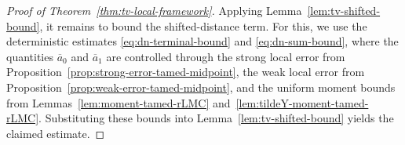 \documentclass[11pt,a4paper,reqno]{amsart}
\theoremstyle{plain}
\theoremstyle{definition}
\theoremstyle{remark}
\begin{document}
\begin{proof}[Proof of Theorem~\ref{thm:tv-local-framework}]
Applying Lemma~\ref{lem:tv-shifted-bound}, it remains to bound the shifted-distance term.  
For this, we use the deterministic estimates \eqref{eq:dn-terminal-bound} and
\eqref{eq:dn-sum-bound}, where the quantities \(\overline a_0\) and \(\overline a_1\)
are controlled through the strong local error from Proposition~\ref{prop:strong-error-tamed-midpoint},
the weak local error from Proposition~\ref{prop:weak-error-tamed-midpoint}, and the uniform
moment bounds from Lemmas~\ref{lem:moment-tamed-rLMC} and~\ref{lem:tildeY-moment-tamed-rLMC}.
Substituting these bounds into Lemma~\ref{lem:tv-shifted-bound} yields the claimed estimate.
\end{proof}







 
\end{document}
